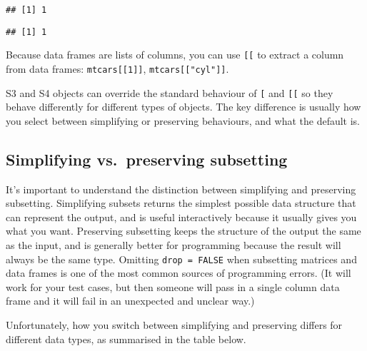 \begin{verbatim}
## [1] 1
\end{verbatim}

\begin{Shaded}
\begin{Highlighting}[]
\NormalTok{b[[}\NormalTok{]][[}\NormalTok{]][[}\NormalTok{]][[}\NormalTok{]]}
\end{Highlighting}
\end{Shaded}

\begin{verbatim}
## [1] 1
\end{verbatim}

Because data frames are lists of columns, you can use \texttt{{[}{[}} to
extract a column from data frames: \texttt{mtcars{[}{[}1{]}{]}},
\texttt{mtcars{[}{[}"cyl"{]}{]}}. 

S3 and S4 objects can override the standard behaviour of \texttt{{[}}
and \texttt{{[}{[}} so they behave differently for different types of
objects. The key difference is usually how you select between
simplifying or preserving behaviours, and what the default is.

\hypertarget{simplify-preserve}{%
\subsection{Simplifying vs.~preserving
subsetting}\label{simplify-preserve}}

It's important to understand the distinction between simplifying and
preserving subsetting. Simplifying subsets returns the simplest possible
data structure that can represent the output, and is useful
interactively because it usually gives you what you want. Preserving
subsetting keeps the structure of the output the same as the input, and
is generally better for programming because the result will always be
the same type. Omitting \texttt{drop\ =\ FALSE} when subsetting matrices
and data frames is one of the most common sources of programming errors.
(It will work for your test cases, but then someone will pass in a
single column data frame and it will fail in an unexpected and unclear
way.)  

Unfortunately, how you switch between simplifying and preserving differs
for different data types, as summarised in the table below.

